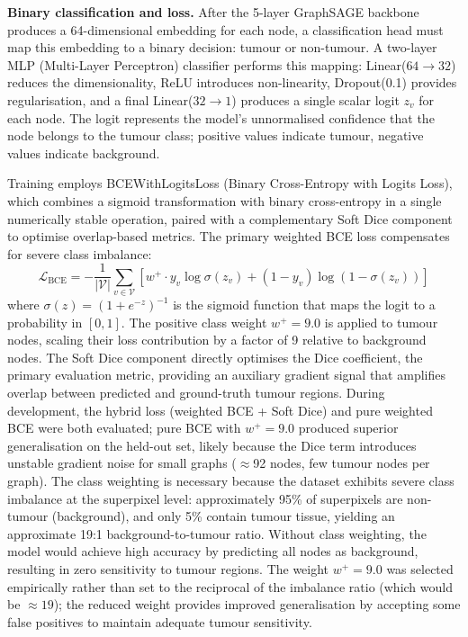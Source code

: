 \documentclass{article}
\begin{document}
\textbf{Binary classification and loss.}
After the 5-layer GraphSAGE backbone produces a 64-dimensional embedding for each
node, a classification head must map this embedding to a binary decision: tumour or
non-tumour. A two-layer MLP (Multi-Layer Perceptron) classifier performs this
mapping: Linear($64 \to 32$) reduces the dimensionality, ReLU introduces
non-linearity, Dropout(0.1) provides regularisation, and a final
Linear($32 \to 1$) produces a single scalar logit $z_v$ for each node. The logit
represents the model's unnormalised confidence that the node belongs to the tumour
class; positive values indicate tumour, negative values indicate background.

Training employs BCEWithLogitsLoss (Binary Cross-Entropy with Logits Loss), which
combines a sigmoid transformation with binary cross-entropy in a single numerically
stable operation, paired with a complementary Soft Dice component to optimise
overlap-based metrics. The primary weighted BCE loss compensates for severe class
imbalance:
\[
    \mathcal{L}_{\text{BCE}} = -\frac{1}{|\mathcal{V}|} \sum_{v \in \mathcal{V}} \left[
        w^+ \cdot y_v \log \sigma(z_v) + (1 - y_v) \log(1 - \sigma(z_v))
    \right]
\]
where $\sigma(z) = (1 + e^{-z})^{-1}$ is the sigmoid function that maps the logit
to a probability in $[0, 1]$. The positive class weight $w^+ = 9.0$ is applied to
tumour nodes, scaling their loss contribution by a factor of 9 relative to background
nodes. The Soft Dice component directly optimises the Dice coefficient, the primary
evaluation metric, providing an auxiliary gradient signal that amplifies overlap
between predicted and ground-truth tumour regions. During development, the hybrid
loss (weighted BCE + Soft Dice) and pure weighted BCE were both evaluated; pure BCE
with $w^+ = 9.0$ produced superior generalisation on the held-out set, likely because
the Dice term introduces unstable gradient noise for small graphs ($\approx$92 nodes,
few tumour nodes per graph). The class weighting is necessary because the dataset
exhibits severe class imbalance at the superpixel level: approximately 95\% of
superpixels are non-tumour (background), and only 5\% contain tumour tissue, yielding
an approximate 19:1 background-to-tumour ratio. Without class weighting, the model
would achieve high accuracy by predicting all nodes as background, resulting in zero
sensitivity to tumour regions. The weight $w^+ = 9.0$ was selected empirically rather
than set to the reciprocal of the imbalance ratio (which would be $\approx 19$); the
reduced weight provides improved generalisation by accepting some false positives to
maintain adequate tumour sensitivity.
\end{document}
